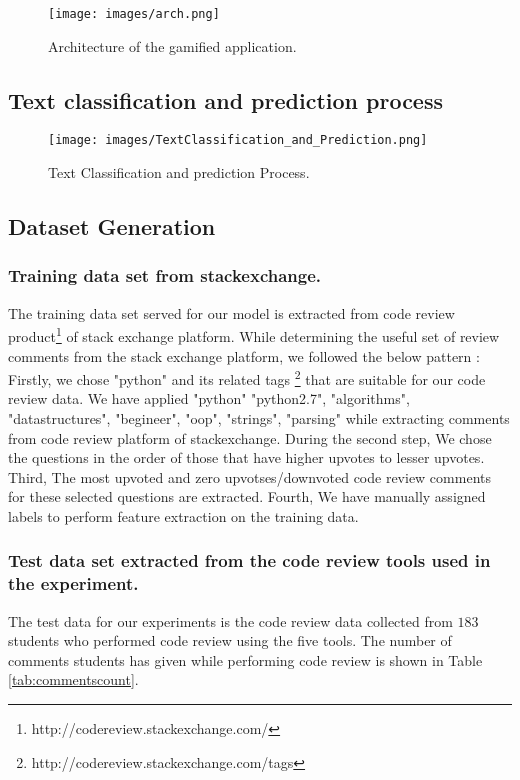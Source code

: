 \documentclass[conference]{IEEEtran}
\begin{document}

\begin{figure*}[ht]
\centering
\texttt{[image: images/arch.png]}
\caption{Architecture of the gamified application.}
\label{fig:architecture}
\end{figure*}

\subsection{Text classification and prediction process}
\begin{figure}[ht]
\centering
\texttt{[image: images/TextClassification\_and\_Prediction.png]}
\caption{Text Classification and prediction Process.}
\label{fig:activity}
\end{figure}
\subsection{Dataset Generation}
\subsubsection{Training data set from stackexchange.}
The training data set served for our model is extracted from code review product\footnote{http://codereview.stackexchange.com/} of stack exchange platform. While determining the useful set of review comments from the stack exchange platform, we followed the below pattern :
Firstly, we chose "python" and its related tags \footnote{http://codereview.stackexchange.com/tags} that are suitable for our code review data. We have applied "python" "python2.7", "algorithms", "datastructures", "begineer", "oop", "strings", "parsing" while extracting comments from code review platform of stackexchange. \newline During the second step, We chose the questions in the order of those that have higher upvotes to lesser upvotes. \newline Third, The most upvoted and zero upvotses/downvoted code review comments for these selected questions are extracted. \newline Fourth, We have manually assigned labels to perform feature extraction on the training data.

\subsubsection{Test data set extracted from the code review tools used in the experiment.}
The test data for our experiments is the code review data collected from $183$ students who performed code review using the five tools. The number of comments students has given while performing code review is shown in Table \ref{tab:commentscount}.
\end{document}
